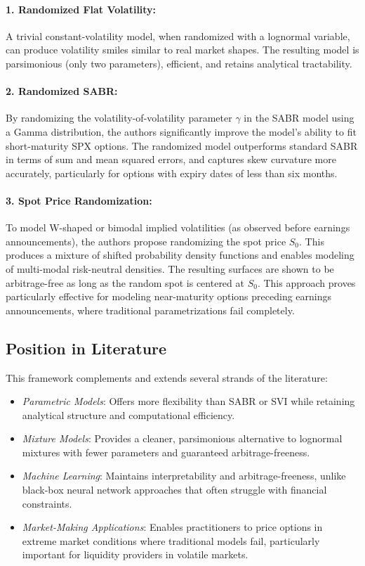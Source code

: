 \paragraph{1. Randomized Flat Volatility:}
A trivial constant-volatility model, when randomized with a lognormal variable, can produce volatility smiles similar to real market shapes. The resulting model is parsimonious (only two parameters), efficient, and retains analytical tractability.

\paragraph{2. Randomized SABR:}
By randomizing the volatility-of-volatility parameter $\gamma$ in the SABR model using a Gamma distribution, the authors significantly improve the model's ability to fit short-maturity SPX options. The randomized model outperforms standard SABR in terms of sum and mean squared errors, and captures skew curvature more accurately, particularly for options with expiry dates of less than six months.

\paragraph{3. Spot Price Randomization:}
To model W-shaped or bimodal implied volatilities (as observed before earnings announcements), the authors propose randomizing the spot price $S_0$. This produces a mixture of shifted probability density functions and enables modeling of multi-modal risk-neutral densities. The resulting surfaces are shown to be arbitrage-free as long as the random spot is centered at $S_0$. This approach proves particularly effective for modeling near-maturity options preceding earnings announcements, where traditional parametrizations fail completely.

\subsection{Position in Literature}

This framework complements and extends several strands of the literature:

\begin{itemize}
    \item \textit{Parametric Models}: Offers more flexibility than SABR or SVI while retaining analytical structure and computational efficiency.
    \item \textit{Mixture Models}: Provides a cleaner, parsimonious alternative to lognormal mixtures with fewer parameters and guaranteed arbitrage-freeness.
    \item \textit{Machine Learning}: Maintains interpretability and arbitrage-freeness, unlike black-box neural network approaches that often struggle with financial constraints.
    \item \textit{Market-Making Applications}: Enables practitioners to price options in extreme market conditions where traditional models fail, particularly important for liquidity providers in volatile markets.
\end{itemize}

